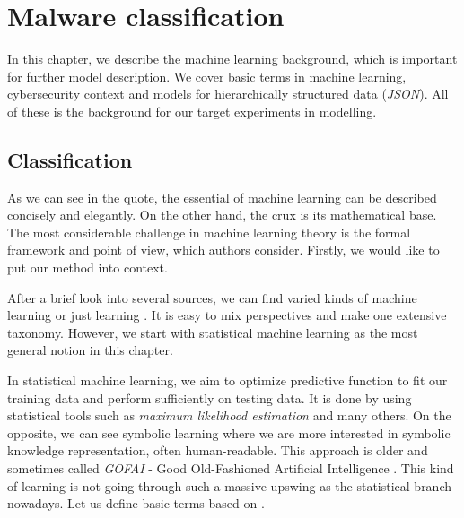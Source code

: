 \chapter{Malware classification} \label{chap:classification}
In this chapter, we describe the machine learning background, which is important for further model description. We cover basic terms in machine learning, cybersecurity context and models for hierarchically structured data (\emph{JSON}). All of these is the background for our target experiments in modelling.

\section{Classification}
 \cite{Russell2009}

As we can see in the quote, the essential of machine learning can be described concisely and elegantly. On the other hand, the crux is its mathematical base. The most considerable challenge in machine learning theory is the formal framework and point of view, which authors consider. Firstly, we would like to put our method into context.

After a brief look into several sources, we can find varied kinds of machine learning or just learning \cite{Russell2009}. It is easy to mix perspectives and make one extensive taxonomy. However, we start with statistical machine learning as the most general notion in this chapter. 

In statistical machine learning, we aim to optimize predictive function to fit our training data and perform sufficiently on testing data. It is done by using statistical tools such as \emph{maximum likelihood estimation} and many others. On the opposite, we can see symbolic learning where we are more interested in symbolic knowledge representation, often human-readable. This approach is older and sometimes called \emph{GOFAI} - Good Old-Fashioned Artificial Intelligence \cite{Haugeland1985}. This kind of learning is not going through such a massive upswing as the statistical branch nowadays. Let us define basic terms based on \cite{Franc2020}.


